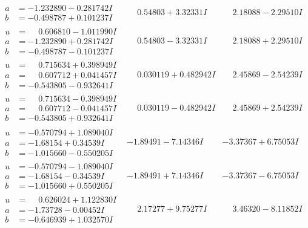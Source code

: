 \documentclass[1p]{elsarticle_modified}
\theoremstyle{definition}
\begin{document}
$$\begin{array}{c|c|c}
\begin{aligned}
a &= -1.232890 - 0.281742 I \\
b &= -0.498787 + 0.101237 I\end{aligned}
 & \phantom{-}0.54803 + 3.32331 I & \phantom{-}2.18088 - 2.29510 I \\ \hline\begin{aligned}
u &= \phantom{-}0.606810 - 1.011990 I \\
a &= -1.232890 + 0.281742 I \\
b &= -0.498787 - 0.101237 I\end{aligned}
 & \phantom{-}0.54803 - 3.32331 I & \phantom{-}2.18088 + 2.29510 I \\ \hline\begin{aligned}
u &= \phantom{-}0.715634 + 0.398949 I \\
a &= \phantom{-}0.607712 + 0.041457 I \\
b &= -0.543805 - 0.932641 I\end{aligned}
 & \phantom{-}0.030119 + 0.482942 I & \phantom{-}2.45869 - 2.54239 I \\ \hline\begin{aligned}
u &= \phantom{-}0.715634 - 0.398949 I \\
a &= \phantom{-}0.607712 - 0.041457 I \\
b &= -0.543805 + 0.932641 I\end{aligned}
 & \phantom{-}0.030119 - 0.482942 I & \phantom{-}2.45869 + 2.54239 I \\ \hline\begin{aligned}
u &= -0.570794 + 1.089040 I \\
a &= -1.68154 + 0.34539 I \\
b &= -1.015660 - 0.550205 I\end{aligned}
 & -1.89491 - 7.14346 I & -3.37367 + 6.75053 I \\ \hline\begin{aligned}
u &= -0.570794 - 1.089040 I \\
a &= -1.68154 - 0.34539 I \\
b &= -1.015660 + 0.550205 I\end{aligned}
 & -1.89491 + 7.14346 I & -3.37367 - 6.75053 I \\ \hline\begin{aligned}
u &= \phantom{-}0.626024 + 1.122830 I \\
a &= -1.73728 - 0.00452 I \\
b &= -0.646939 + 1.032570 I\end{aligned}
 & \phantom{-}2.17277 + 9.75277 I & \phantom{-}3.46320 - 8.11852 I \\ \hline\begin{aligned}

\end{aligned}
\end{array}$$
\end{document}
